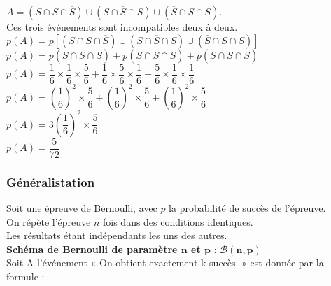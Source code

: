 \newpage

$ A = \left(S \cap S \cap \overline{S} \right) \cup \left(S \cap \overline{S} \cap S \right) \cup \left(\overline{S} \cap S \cap S\right)$. \\

Ces trois événements sont incompatibles deux à deux. \\

$ p\left(A\right) = p\left[\left(S \cap S \cap \overline{S} \right) \cup \left(S \cap \overline{S} \cap S \right) \cup \left(\overline{S} \cap S \cap S\right)\right] $ \\

$ p\left(A\right) = p\left(S \cap S \cap \overline{S} \right) + p\left(S \cap \overline{S} \cap S \right) + p\left(\overline{S} \cap S \cap S\right) $ \\

$ p\left(A\right) = \dfrac{1}{6} \times \dfrac{1}{6} \times \dfrac{5}{6} + \dfrac{1}{6} \times \dfrac{5}{6} \times \dfrac{1}{6} + \dfrac{5}{6} \times \dfrac{1}{6} \times \dfrac{1}{6} $ \\

$ p\left(A\right) =  \left(\dfrac{1}{6}\right)^2 \times \dfrac{5}{6} + \left(\dfrac{1}{6}\right)^2 \times \dfrac{5}{6} + \left(\dfrac{1}{6}\right)^2 \times \dfrac{5}{6} $ \\

$p\left(A\right) = 3 \left(\dfrac{1}{6} \right)^2 \times \dfrac{5}{6} $ \\

$ p\left(A\right) = \dfrac{5}{72} $

\subsubsection{Généralistation}

Soit une épreuve de Bernoulli, avec $p$ la probabilité de succès de l'épreuve. \\

On répète l'épreuve $n$ fois dans des conditions identiques. \\ Les résultats étant indépendants les uns des autres. \\

\textbf{Schéma de Bernoulli de paramètre $\mathbf{n}$ et $\mathbf{p}$} : $\mathbf{\mathcal{B} \left(n,p\right)}$ \\

Soit A l'événement « On obtient exactement k succès. » est donnée par la formule : \\

